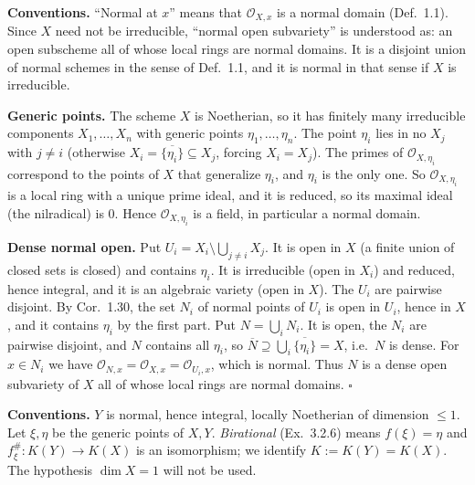\documentclass[11pt]{article}
\begin{document}
\pf
\textbf{Conventions.} ``Normal at $x$'' means that $\mathcal O_{X,x}$ is a normal domain (Def.~1.1). Since $X$ need not be irreducible, ``normal open subvariety'' is understood as: an open subscheme all of whose local rings are normal domains. It is a disjoint union of normal schemes in the sense of Def.~1.1, and it is normal in that sense if $X$ is irreducible.

\textbf{Generic points.} The scheme $X$ is Noetherian, so it has finitely many irreducible components $X_1,\dots,X_n$ with generic points $\eta_1,\dots,\eta_n$. The point $\eta_i$ lies in no $X_j$ with $j\ne i$ (otherwise $X_i=\overline{\{\eta_i\}}\subseteq X_j$, forcing $X_i=X_j$). The primes of $\mathcal O_{X,\eta_i}$ correspond to the points of $X$ that generalize $\eta_i$, and $\eta_i$ is the only one. So $\mathcal O_{X,\eta_i}$ is a local ring with a unique prime ideal, and it is reduced, so its maximal ideal (the nilradical) is $0$. Hence $\mathcal O_{X,\eta_i}$ is a field, in particular a normal domain.

\textbf{Dense normal open.} Put $U_i=X_i\setminus\bigcup_{j\ne i}X_j$. It is open in $X$ (a finite union of closed sets is closed) and contains $\eta_i$. It is irreducible (open in $X_i$) and reduced, hence integral, and it is an algebraic variety (open in $X$). The $U_i$ are pairwise disjoint. By Cor.~1.30, the set $N_i$ of normal points of $U_i$ is open in $U_i$, hence in $X$, and it contains $\eta_i$ by the first part. Put $N=\bigcup_iN_i$. It is open, the $N_i$ are pairwise disjoint, and $N$ contains all $\eta_i$, so $\overline N\supseteq\bigcup_i\overline{\{\eta_i\}}=X$, i.e.\ $N$ is dense. For $x\in N_i$ we have $\mathcal O_{N,x}=\mathcal O_{X,x}=\mathcal O_{U_i,x}$, which is normal. Thus $N$ is a dense open subvariety of $X$ all of whose local rings are normal domains. \hfill$\square$

\pf
\textbf{Conventions.} $Y$ is normal, hence integral, locally Noetherian of dimension $\le1$. Let $\xi,\eta$ be the generic points of $X,Y$. \emph{Birational} (Ex.~3.2.6) means $f(\xi)=\eta$ and $f^\#_\xi:K(Y)\to K(X)$ is an isomorphism; we identify $K:=K(Y)=K(X)$. The hypothesis $\dim X=1$ will not be used.
\end{document}
